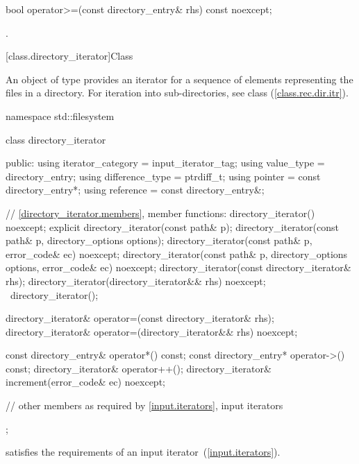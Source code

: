 \begin{itemdecl}
bool operator>=(const directory_entry& rhs) const noexcept;
\end{itemdecl}

\begin{itemdescr}
\pnum
\returns {}.
\end{itemdescr}

[class.directory_iterator]{Class }

\pnum
An object of type  provides an iterator for a
sequence of  elements representing the files in a
directory.
\enternote For iteration into sub-directories, see class 
(\ref{class.rec.dir.itr}). \exitnote

\begin{codeblock}
namespace std::filesystem {
  class directory_iterator {
  public:
    using iterator_category = input_iterator_tag;
    using value_type        = directory_entry;
    using difference_type   = ptrdiff_t;
    using pointer           = const directory_entry*;
    using reference         = const directory_entry&;

    // \ref{directory_iterator.members}, member functions:
    directory_iterator() noexcept;
    explicit directory_iterator(const path& p);
    directory_iterator(const path& p, directory_options options);
    directory_iterator(const path& p, error_code& ec) noexcept;
    directory_iterator(const path& p, directory_options options,
                       error_code& ec) noexcept;
    directory_iterator(const directory_iterator& rhs);
    directory_iterator(directory_iterator&& rhs) noexcept;
   ~directory_iterator();

    directory_iterator& operator=(const directory_iterator& rhs);
    directory_iterator& operator=(directory_iterator&& rhs) noexcept;

    const directory_entry& operator*() const;
    const directory_entry* operator->() const;
    directory_iterator&    operator++();
    directory_iterator&    increment(error_code& ec) noexcept;

    // other members as required by \ref{input.iterators}, input iterators
  };
}
\end{codeblock}

\pnum
  satisfies the requirements of an input
iterator~(\ref{input.iterators}).

